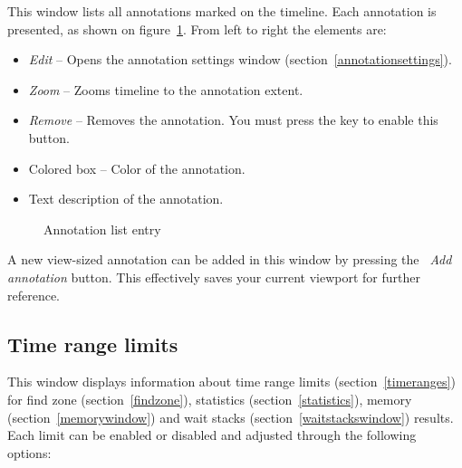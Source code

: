 \documentclass[hidelinks,titlepage,a4paper]{article}
\begin{document}
This window lists all annotations marked on the timeline. Each annotation is presented, as shown on figure~\ref{figannlist}. From left to right the elements are:

\begin{itemize}
\item \emph{\faEdit{} Edit} -- Opens the annotation settings window (section~\ref{annotationsettings}).
\item \emph{\faMicroscope{} Zoom} -- Zooms timeline to the annotation extent.
\item \emph{\faTrash*{} Remove} -- Removes the annotation. You must press the \keys{\ctrl} key to enable this button.
\item Colored box -- Color of the annotation.
\item Text description of the annotation.
\end{itemize}

\begin{figure}[h]
\centering{}
\caption{Annotation list entry}
\label{figannlist}
\end{figure}

A new view-sized annotation can be added in this window by pressing the \emph{\faPlus{}~Add annotation} button. This effectively saves your current viewport for further reference.

\subsection{Time range limits}
\label{timerangelimits}

This window displays information about time range limits (section~\ref{timeranges}) for find zone (section~\ref{findzone}), statistics (section~\ref{statistics}), memory (section~\ref{memorywindow}) and wait stacks (section~\ref{waitstackswindow}) results. Each limit can be enabled or disabled and adjusted through the following options:
\end{document}
